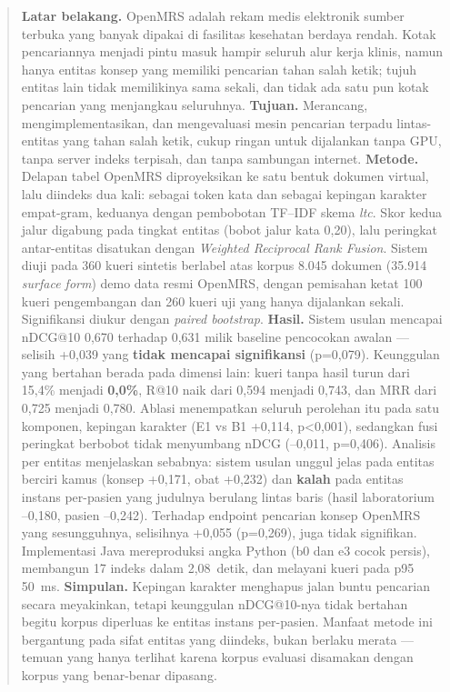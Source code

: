 \documentclass[journal,twoside,web]{ieeecolor}
\newcommand{\abslabel}{Abstract}
\begin{document}
\renewcommand{\abslabel}{Abstrak}
\begin{abstract}
\textbf{Latar belakang.} OpenMRS adalah rekam medis elektronik sumber terbuka
yang banyak dipakai di fasilitas kesehatan berdaya rendah. Kotak pencariannya
menjadi pintu masuk hampir seluruh alur kerja klinis, namun hanya entitas konsep
yang memiliki pencarian tahan salah ketik; tujuh entitas lain tidak memilikinya
sama sekali, dan tidak ada satu pun kotak pencarian yang menjangkau seluruhnya.
\textbf{Tujuan.} Merancang, mengimplementasikan, dan mengevaluasi mesin
pencarian terpadu lintas-entitas yang tahan salah ketik, cukup ringan untuk
dijalankan tanpa GPU, tanpa server indeks terpisah, dan tanpa sambungan
internet. \textbf{Metode.} Delapan tabel OpenMRS diproyeksikan ke satu bentuk
dokumen virtual, lalu diindeks dua kali: sebagai token kata dan sebagai kepingan
karakter empat-gram, keduanya dengan pembobotan TF--IDF skema \emph{ltc}. Skor
kedua jalur digabung pada tingkat entitas (bobot jalur kata 0,20), lalu peringkat
antar-entitas disatukan dengan \emph{Weighted Reciprocal Rank Fusion}. Sistem
diuji pada 360 kueri sintetis berlabel atas korpus 8.045 dokumen (35.914
\emph{surface form}) demo data resmi OpenMRS, dengan pemisahan ketat 100 kueri
pengembangan dan 260 kueri uji yang hanya dijalankan sekali. Signifikansi diukur
dengan \emph{paired bootstrap}. \textbf{Hasil.} Sistem usulan mencapai nDCG@10
0,670 terhadap 0,631 milik baseline pencocokan awalan --- selisih +0,039 yang
\textbf{tidak mencapai signifikansi} (p=0,079). Keunggulan yang bertahan berada
pada dimensi lain: kueri tanpa hasil turun dari 15,4\% menjadi \textbf{0,0\%},
R@10 naik dari 0,594 menjadi 0,743, dan MRR dari 0,725 menjadi 0,780. Ablasi
menempatkan seluruh perolehan itu pada satu komponen, kepingan karakter (E1 vs
B1 +0,114, p<0,001), sedangkan fusi peringkat berbobot tidak menyumbang nDCG
(--0,011, p=0,406). Analisis per entitas menjelaskan sebabnya: sistem usulan
unggul jelas pada entitas berciri kamus (konsep +0,171, obat +0,232) dan
\textbf{kalah} pada entitas instans per-pasien yang judulnya berulang lintas
baris (hasil laboratorium --0,180, pasien --0,242). Terhadap endpoint pencarian
konsep OpenMRS yang sesungguhnya, selisihnya +0,055 (p=0,269), juga tidak
signifikan. Implementasi Java mereproduksi angka Python (b0 dan e3 cocok persis),
membangun 17 indeks dalam 2,08~detik, dan melayani kueri pada p95 50~ms.
\textbf{Simpulan.} Kepingan karakter menghapus jalan buntu pencarian secara
meyakinkan, tetapi keunggulan nDCG@10-nya tidak bertahan begitu korpus diperluas
ke entitas instans per-pasien. Manfaat metode ini bergantung pada sifat entitas
yang diindeks, bukan berlaku merata --- temuan yang hanya terlihat karena korpus
evaluasi disamakan dengan korpus yang benar-benar dipasang.
\end{abstract}
\end{document}
